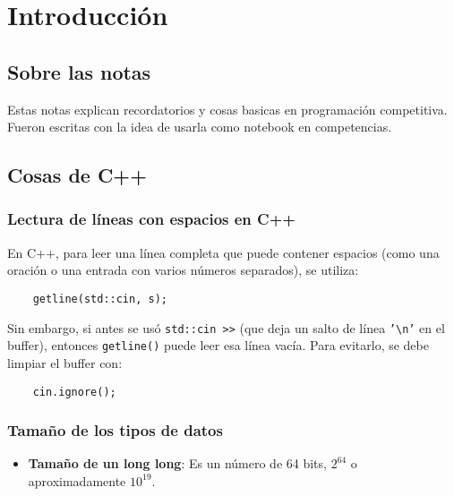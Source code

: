 \chapter{Introducción}

\section{Sobre las notas}
Estas notas explican recordatorios y cosas basicas en programación competitiva. 
Fueron escritas con la idea de usarla como notebook en competencias. 

\section{Cosas de C++}

\subsection*{Lectura de líneas con espacios en C++}

En C++, para leer una línea completa que puede contener espacios (como una oración o una entrada con varios números separados), se utiliza:

\begin{verbatim}
	getline(std::cin, s);
\end{verbatim}

Sin embargo, si antes se usó \texttt{std::cin >>} (que deja un salto de línea \texttt{'\textbackslash n'} en el buffer), entonces \texttt{getline()} puede leer esa línea vacía. Para evitarlo, se debe limpiar el buffer con:

\begin{verbatim}
	cin.ignore();
\end{verbatim}


\subsection*{Tamaño de los tipos de datos}
\begin{itemize}
	\item \textbf{Tamaño de un long long}: Es un número de 64 bits, \( 2^{64} \) o aproximadamente \( 10^{19} \).
\end{itemize}

